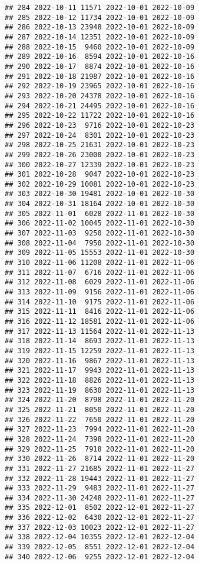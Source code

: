 \documentclass[
]{article}
\begin{document}
\begin{verbatim}
## 284 2022-10-11 11571 2022-10-01 2022-10-09
## 285 2022-10-12 11734 2022-10-01 2022-10-09
## 286 2022-10-13 23948 2022-10-01 2022-10-09
## 287 2022-10-14 12351 2022-10-01 2022-10-09
## 288 2022-10-15  9460 2022-10-01 2022-10-09
## 289 2022-10-16  8594 2022-10-01 2022-10-16
## 290 2022-10-17  8874 2022-10-01 2022-10-16
## 291 2022-10-18 21987 2022-10-01 2022-10-16
## 292 2022-10-19 23965 2022-10-01 2022-10-16
## 293 2022-10-20 24378 2022-10-01 2022-10-16
## 294 2022-10-21 24495 2022-10-01 2022-10-16
## 295 2022-10-22 11722 2022-10-01 2022-10-16
## 296 2022-10-23  9716 2022-10-01 2022-10-23
## 297 2022-10-24  8301 2022-10-01 2022-10-23
## 298 2022-10-25 21631 2022-10-01 2022-10-23
## 299 2022-10-26 23000 2022-10-01 2022-10-23
## 300 2022-10-27 12339 2022-10-01 2022-10-23
## 301 2022-10-28  9047 2022-10-01 2022-10-23
## 302 2022-10-29 10081 2022-10-01 2022-10-23
## 303 2022-10-30 19481 2022-10-01 2022-10-30
## 304 2022-10-31 18164 2022-10-01 2022-10-30
## 305 2022-11-01  6028 2022-11-01 2022-10-30
## 306 2022-11-02 10045 2022-11-01 2022-10-30
## 307 2022-11-03  9250 2022-11-01 2022-10-30
## 308 2022-11-04  7950 2022-11-01 2022-10-30
## 309 2022-11-05 15553 2022-11-01 2022-10-30
## 310 2022-11-06 11208 2022-11-01 2022-11-06
## 311 2022-11-07  6716 2022-11-01 2022-11-06
## 312 2022-11-08  6029 2022-11-01 2022-11-06
## 313 2022-11-09  9156 2022-11-01 2022-11-06
## 314 2022-11-10  9175 2022-11-01 2022-11-06
## 315 2022-11-11  8416 2022-11-01 2022-11-06
## 316 2022-11-12 18581 2022-11-01 2022-11-06
## 317 2022-11-13 11564 2022-11-01 2022-11-13
## 318 2022-11-14  8693 2022-11-01 2022-11-13
## 319 2022-11-15 12259 2022-11-01 2022-11-13
## 320 2022-11-16  9867 2022-11-01 2022-11-13
## 321 2022-11-17  9943 2022-11-01 2022-11-13
## 322 2022-11-18  8826 2022-11-01 2022-11-13
## 323 2022-11-19  8630 2022-11-01 2022-11-13
## 324 2022-11-20  8798 2022-11-01 2022-11-20
## 325 2022-11-21  8050 2022-11-01 2022-11-20
## 326 2022-11-22  7650 2022-11-01 2022-11-20
## 327 2022-11-23  7994 2022-11-01 2022-11-20
## 328 2022-11-24  7398 2022-11-01 2022-11-20
## 329 2022-11-25  7918 2022-11-01 2022-11-20
## 330 2022-11-26  8714 2022-11-01 2022-11-20
## 331 2022-11-27 21685 2022-11-01 2022-11-27
## 332 2022-11-28 19443 2022-11-01 2022-11-27
## 333 2022-11-29  9483 2022-11-01 2022-11-27
## 334 2022-11-30 24248 2022-11-01 2022-11-27
## 335 2022-12-01  8502 2022-12-01 2022-11-27
## 336 2022-12-02  6430 2022-12-01 2022-11-27
## 337 2022-12-03 10023 2022-12-01 2022-11-27
## 338 2022-12-04 10355 2022-12-01 2022-12-04
## 339 2022-12-05  8551 2022-12-01 2022-12-04
## 340 2022-12-06  9255 2022-12-01 2022-12-04

\end{verbatim}
\end{document}
